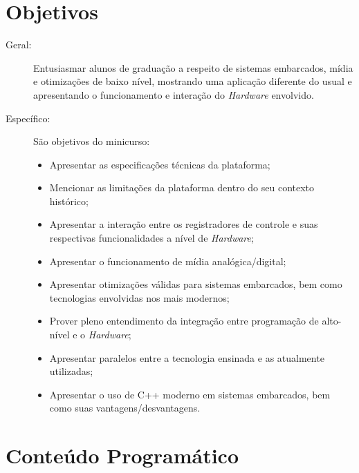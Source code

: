 \documentclass{article}
\begin{document}
\section{Objetivos}

\begin{description}
    \item[Geral:] Entusiasmar alunos de graduação a respeito de sistemas
        embarcados, mídia e otimizações de baixo nível, mostrando uma aplicação
        diferente do usual e apresentando o funcionamento e interação do
        \textit{Hardware} envolvido.
    \item[Específico:] São objetivos do minicurso:
        \begin{itemize}[label={-}]
            \item Apresentar as especificações técnicas da plataforma;
            \item Mencionar as limitações da plataforma dentro do seu contexto
                histórico;
            \item Apresentar a interação entre os registradores de controle e
                suas respectivas funcionalidades a nível de \textit{Hardware};
            \item Apresentar o funcionamento de mídia analógica/digital;
            \item Apresentar otimizações válidas para sistemas embarcados, bem
                como tecnologias envolvidas nos mais modernos;
            \item Prover pleno entendimento da integração entre programação de
                alto-nível e o \textit{Hardware};
            \item Apresentar paralelos entre a tecnologia ensinada e as
                atualmente utilizadas;
            \item Apresentar o uso de C++ moderno em sistemas embarcados, bem
                como suas vantagens/desvantagens.
        \end{itemize}
\end{description}

\section{Conteúdo Programático}
\end{document}
